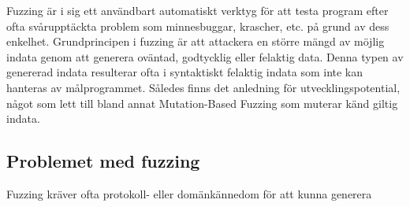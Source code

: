 Fuzzing är i sig ett användbart automatiskt verktyg för att testa program efter
ofta svårupptäckta problem som minnesbuggar, krascher, etc. på grund av dess
enkelhet. Grundprincipen i fuzzing är att attackera en större mängd av möjlig
indata genom att generera oväntad, godtycklig eller felaktig data. Denna typen
av genererad indata resulterar ofta i syntaktiskt felaktig indata som inte kan
hanteras av målprogrammet. Således finns det anledning för utvecklingspotential,
något som lett till bland annat Mutation-Based Fuzzing som muterar känd giltig 
indata.  

\subsection{Problemet med fuzzing}
Fuzzing kräver ofta protokoll- eller domänkännedom för att kunna generera 




